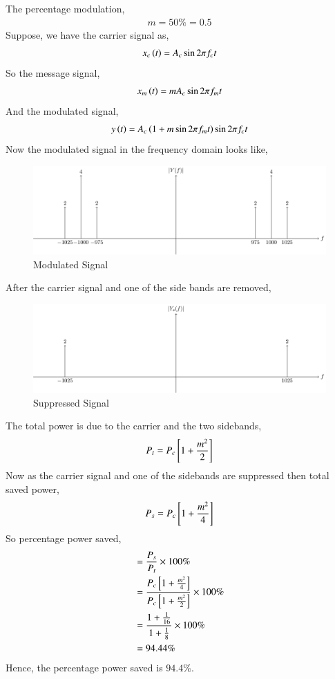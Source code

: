 \documentclass[journal,12pt,twocolumn]{IEEEtran}
\theoremstyle{remark}
\begin{document}
\solution

The percentage modulation,
\begin{align}
    m=50\%=0.5
\end{align}
Suppose, we have the carrier signal as,
\begin{align}
    x_c\left(t\right)=A_c\sin{2\pi f_ct}
\end{align}
So the message signal,
\begin{align}
    x_m\left(t\right)=mA_c\sin{2\pi f_mt}
\end{align}
And the modulated signal,
\begin{align}
    y\left(t\right)=A_c\left(1+m\sin{2\pi f_mt}\right)\sin{2\pi f_ct}
\end{align}
Now the modulated signal in the frequency domain looks like,
\begin{figure}[h!]
    \centering
    \includegraphics[width=\columnwidth]{figs/Modulated.png}
    \caption{Modulated Signal}
\end{figure}
After the carrier signal and one of the side bands are removed,
\begin{figure}[h!]
    \centering
    \includegraphics[width=\columnwidth]{figs/Suppressed.png}
    \caption{Suppressed Signal}
\end{figure}
The total power is due to the carrier and the two sidebands,
\begin{align}
    P_t=P_c{}\left[1+\frac{m^2}{2}\right]
\end{align}
Now as the carrier signal and one of the sidebands are suppressed then total saved power,
\begin{align}
    P_s=P_c{}\left[1+\frac{m^2}{4}\right]
\end{align}
So percentage power saved,
\begin{align}
    &=\frac{P_s}{P_t}\times100\% \\
    &=\frac{P_c{}\left[1+\frac{m^2}{4}\right]}{P_c{}\left[1+\frac{m^2}{2}\right]}\times100\% \\
    &=\frac{1+\frac{1}{16}}{1+\frac{1}{8}}\times100\% \\
    &=94.44\%
\end{align}
Hence, the percentage power saved is $94.4\%$.
\end{document}

